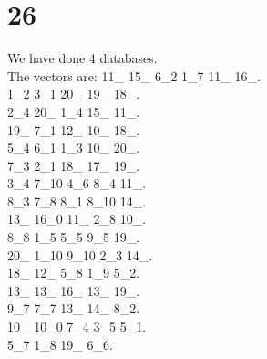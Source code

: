 \chapter{26}
\indent We have done 4 databases.\\
The vectors are:
11\_ 15\_ 6\_2 1\_7 11\_ 16\_.\\1\_2 3\_1 20\_ 19\_ 18\_.\\2\_4 20\_ 1\_4 15\_ 11\_.\\19\_ 7\_1 12\_ 10\_ 18\_.\\5\_4 6\_1 1\_3 10\_ 20\_.\\7\_3 2\_1 18\_ 17\_ 19\_.\\3\_4 7\_10 4\_6 8\_4 11\_.\\8\_3 7\_8 8\_1 8\_10 14\_.\\13\_ 16\_0 11\_ 2\_8 10\_.\\8\_8 1\_5 5\_5 9\_5 19\_.\\20\_ 1\_10 9\_10 2\_3 14\_.\\18\_ 12\_ 5\_8 1\_9 5\_2.\\13\_ 13\_ 16\_ 13\_ 19\_.\\9\_7 7\_7 13\_ 14\_ 8\_2.\\10\_ 10\_0 7\_4 3\_5 5\_1.\\5\_7 1\_8 19\_ 6\_6.\\